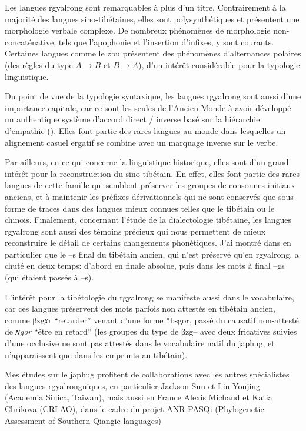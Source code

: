 \documentclass[oldfontcommands,oneside,a4paper,11pt]{memoir}
\newcommand{\ipa}[1]{{\phon #1}} %
\begin{document}
Les langues rgyalrong sont remarquables à plus d’un titre. Contrairement à la majorité des langues sino-tibétaines, elles sont polysynthétiques et présentent une morphologie verbale complexe. De nombreux phénomènes de morphologie non-concaténative, tels que l’apophonie et l’insertion d’infixes, y sont courants. Certaines langues comme le zbu présentent des phénomènes d'alternances polaires (des règles du type $A \rightarrow B$ et $B \rightarrow A$), d'un intérêt considérable pour la typologie linguistique.


Du point de vue de la typologie syntaxique, les langues rgyalrong sont aussi d’une importance capitale, car ce sont les seules de l’Ancien Monde à avoir développé un authentique système d’accord direct / inverse basé sur la hiérarchie d’empathie (\citealt{jacques10inverse}). Elles font partie des rares langues au monde dans lesquelles un alignement casuel ergatif se combine avec un marquage inverse sur le verbe.


Par ailleurs, en ce qui concerne la linguistique historique, elles sont d’un grand intérêt pour la reconstruction du sino-tibétain. En effet, elles font partie des rares langues de cette famille qui semblent préserver les groupes de consonnes initiaux anciens, et à maintenir les préfixes dérivationnels qui ne sont conservés que sous forme de traces dans des langues mieux connues telles que le tibétain ou le chinois. Finalement, concernant l’étude de la dialectologie tibétaine, les langues rgyalrong sont aussi des témoins précieux qui nous permettent de mieux reconstruire le détail de certains changements phonétiques. J'ai montré dans \citet{jacques06s} en particulier que le --s final du tibétain ancien, qui n'est préservé qu'en rgyalrong, a chuté en deux temps: d'abord en finale absolue, puis dans les mots à final --gs (qui étaient passés à --s).

L'intérêt pour la tibétologie du rgyalrong se manifeste aussi dans le vocabulaire, car ces langues préservent des mots parfois non attestés en tibétain ancien, comme \ipa{βzgɤr} ``retarder'' venant d'une forme *bsgor, passé du causatif non-attesté de \textit{ɴgor} ``être en retard'' (les groupes du type de \ipa{βzg--} avec deux fricatives suivies d'une occlusive ne sont pas attestés dans le vocabulaire natif du japhug, et n'apparaissent que dans les emprunts au tibétain).

Mes études sur le japhug profitent de collaborations avec les autres spécialistes des langues rgyalronguiques, en particulier Jackson Sun et Lin Youjing (Academia Sinica, Taiwan), mais  aussi en France Alexis Michaud et Katia Chrikova (CRLAO), dans le cadre du projet ANR PASQi (Phylogenetic Assessment of Southern Qiangic languages) 
\end{document}
